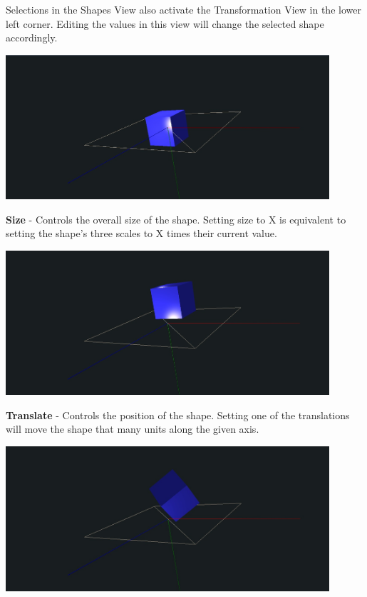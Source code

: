 Selections in the Shapes View also activate the Transformation View in the lower
left corner. Editing the values in this view will change the selected shape
accordingly.

\begin{center}
\includegraphics[width=12cm]{images/GeometryCubeSize.jpg}
\end{center}

\textbf{Size} - Controls the overall size of the shape. Setting size to X is
equivalent to setting the shape's three scales to X times their current value.

\begin{center}
\includegraphics[width=12cm]{images/GeometryCubeTranslate.jpg}
\end{center}

\textbf{Translate} - Controls the position of the shape. Setting one of the
translations will move the shape that many units along the given axis.

\begin{center}
\includegraphics[width=12cm]{images/GeometryCubeRotate.jpg}
\end{center}

